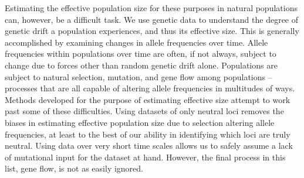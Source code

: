 Estimating the effective population size for these purposes in natural populations can, however, be a difficult task. We use genetic data to understand the degree of genetic drift a population experiences, and thus its effective size. This is generally accomplished by examining changes in allele frequencies over time. Allele frequencies within populations over time are often, if not always, subject to change due to forces other than random genetic drift alone. Populations are subject to natural selection, mutation, and gene flow among populations -- processes that are all capable of altering allele frequencies in multitudes of ways. Methods developed for the purpose of estimating effective size attempt to work past some of these difficulties. Using datasets of only neutral loci removes the biases in estimating effective population size due to selection altering allele frequencies, at least to the best of our ability in identifying which loci are truly neutral. Using data over very short time scales allows us to safely assume a lack of mutational input for the dataset at hand. However, the final process in this list, gene flow, is not as easily ignored.

